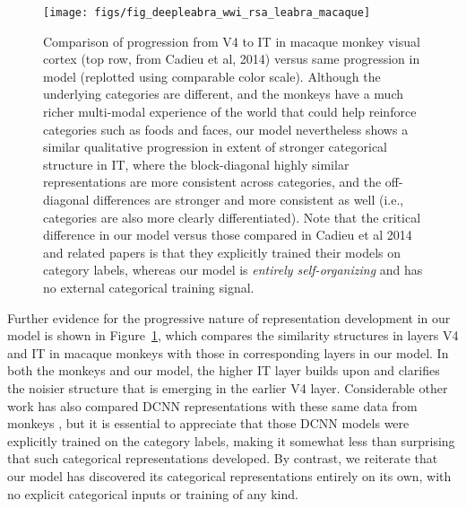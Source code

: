 \documentclass[12pt,twoside]{article}
\newif\myifpdf
\begin{document}
\begin{figure}
  \centering\texttt{[image: figs/fig\_deepleabra\_wwi\_rsa\_leabra\_macaque]}
  \caption{\small Comparison of progression from V4 to IT in macaque monkey visual cortex (top row, from Cadieu et al, 2014) versus same progression in model (replotted using comparable color scale).  Although the underlying categories are different, and the monkeys have a much richer multi-modal experience of the world that could help reinforce categories such as foods and faces, our model nevertheless shows a similar qualitative progression in extent of stronger categorical structure in IT, where the block-diagonal highly similar representations are more consistent across categories, and the off-diagonal differences are stronger and more consistent as well (i.e., categories are also more clearly differentiated).  Note that the critical difference in our model versus those compared in Cadieu et al 2014 and related papers is that they explicitly trained their models on category labels, whereas our model is {\em entirely self-organizing} and has no external categorical training signal.}
  \label{fig.macaque}
\end{figure}

Further evidence for the progressive nature of representation development in our model is shown in Figure~\ref{fig.macaque}, which compares the similarity structures in layers V4 and IT in macaque monkeys \cite{CadieuHongYaminsEtAl14} with those in corresponding layers in our model.  In both the monkeys and our model, the higher IT layer builds upon and clarifies the noisier structure that is emerging in the earlier V4 layer.  Considerable other work has also compared DCNN representations with these same data from monkeys \cite{CadieuHongYaminsEtAl14}, but it is essential to appreciate that those DCNN models were explicitly trained on the category labels, making it somewhat less than surprising that such categorical representations developed.  By contrast, we reiterate that our model has discovered its categorical representations entirely on its own, with no explicit categorical inputs or training of any kind.
\end{document}
